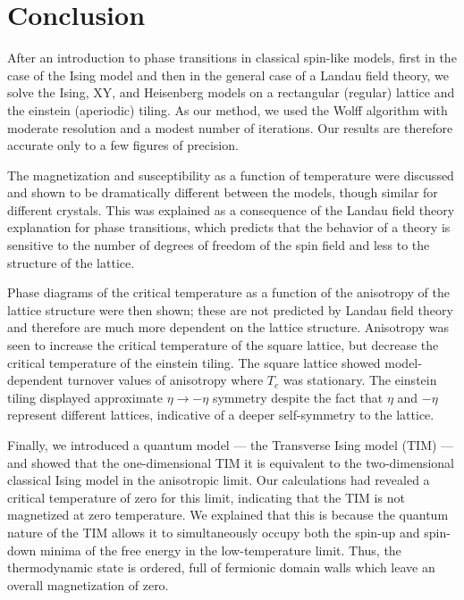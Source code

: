 \documentclass[
  amsmath,
  amssymb,
  aps,
  twocolumn,
  nofootinbib,
  floatfix,
]{revtex4-2}
\begin{document}
\section{Conclusion}
\label{sec:conclusion}
After an introduction to phase transitions in classical spin-like models, first in the case of the Ising model and then in the general case of a Landau field theory, we solve the Ising, XY, and Heisenberg models on a rectangular (regular) lattice and the einstein (aperiodic) tiling. As our method, we used the Wolff algorithm with moderate resolution and a modest number of iterations. Our results are therefore accurate only to a few figures of precision.

The magnetization and susceptibility as a function of temperature were discussed and shown to be dramatically different between the models, though similar for different crystals. This was explained as a consequence of the Landau field theory explanation for phase transitions, which predicts that the behavior of a theory is sensitive to the number of degrees of freedom of the spin field and less to the structure of the lattice.

Phase diagrams of the critical temperature as a function of the anisotropy of the lattice structure were then shown; these are not predicted by Landau field theory and therefore are much more dependent on the lattice structure.  Anisotropy was seen to increase the critical temperature of the square lattice, but decrease the critical temperature of the einstein tiling. The square lattice showed model-dependent turnover values of anisotropy where $T_c$ was stationary. The einstein tiling displayed approximate $\eta \rightarrow -\eta$ symmetry despite the fact that $\eta$ and $-\eta$ represent different lattices, indicative of a deeper self-symmetry to the lattice.

Finally, we introduced a quantum model --- the Transverse Ising model (TIM) --- and showed that the one-dimensional TIM it is equivalent to the two-dimensional classical Ising model in the anisotropic limit. Our calculations had revealed a critical temperature of zero for this limit, indicating that the TIM is not magnetized at zero temperature. We explained that this is because the quantum nature of the TIM allows it to simultaneously occupy both the spin-up and spin-down minima of the free energy in the low-temperature limit. Thus, the thermodynamic state is ordered, full of fermionic domain walls which leave an overall magnetization of zero.


\end{document}
